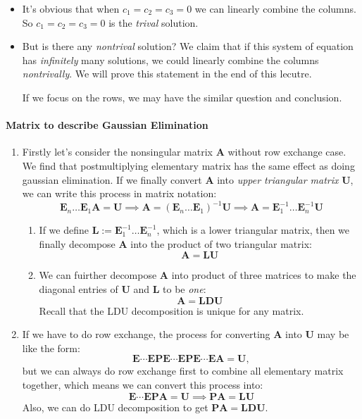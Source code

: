 \begin{itemize}
\item
It's obvious that when $c_1=c_2=c_3=0$ we can linearly combine the columns. So $c_1=c_2=c_3=0$ is the \textit{trival} solution.
\item
But is there any \emph{nontrival} solution? We claim that if this system of equation has \textit{infinitely} many solutions, we could linearly combine the columns \textit{nontrivally}. We will prove this statement in the end of this lecutre.

If we focus on the rows, we may have the similar question and conclusion.
\end{itemize}
\paragraph{Matrix to describe Gaussian Elimination}
\begin{enumerate}
\item
Firstly let's consider the nonsingular matrix $\bm A$ without row exchange case. We find that postmultiplying elementary matrix has the same effect as doing gaussian elimination. If we finally convert $\bm A$ into \textit{upper triangular matrix} $\bm U$, we can write this process in matrix notation:
\[
\bm E_n \ldots \bm E_1\bm A = \bm U\implies \bm A = (\bm E_n \ldots \bm E_1)^{-1}\bm U
\implies \bm A = \bm E_1^{-1} \ldots \bm E_n^{-1}\bm U
\]
\begin{enumerate}
\item
If we define $\bm L := \bm E_1^{-1} \ldots \bm E_n^{-1}$, which is a lower triangular matrix, then we finally decompose $\bm A$ into the product of two triangular matrix:
\[
\bm A = \bm L\bm U
\]
\item
We can fuirther decompose $\bm A$ into product of three matrices to make the diagonal entries of $\bm U$ and $\bm L$ to be \emph{one}:
\[
\bm A = \bm L\bm D\bm U
\]
Recall that the LDU decomposition is unique for any matrix.
\end{enumerate}
\item
If we have to do row exchange, the process for converting $\bm A$ into $\bm U$ may be like the form:
\[
\bm E\cdots \bm E\bm P\bm E\cdots \bm E\bm P \bm E\cdots \bm E\bm A = \bm U,
\]
but we can always do row exchange first to combine all elementary matrix together, which means we can convert this process into:
\[
\bm E \cdots \bm E\bm P\bm A = \bm U\implies \bm P\bm A = \bm L\bm U
\]
Also, we can do LDU decomposition to get $ \bm P\bm A = \bm L\bm D\bm U$.
\end{enumerate}
